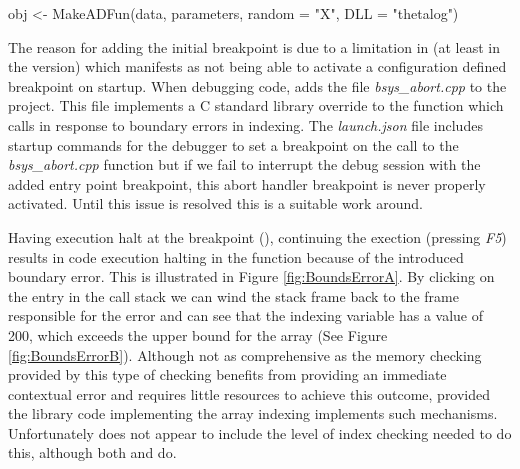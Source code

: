 \begin{Schunk}
  \begin{Sinput}
    obj <- MakeADFun(data, parameters, random = "X", DLL = "thetalog")
  \end{Sinput}
\end{Schunk}

The reason for adding the initial breakpoint is due to a limitation in (at least in the  version)  which manifests as not 
being able to activate a configuration defined breakpoint on startup. When debugging  code,  adds the file \emph{bsys\_abort.cpp}
to the project. This file implements a C standard library override to the  function which  calls in response to 
boundary errors in indexing. The \emph{launch.json} file includes startup commands for the debugger to set a breakpoint on the call to 
the \emph{bsys\_abort.cpp} function but if we fail to interrupt the debug session with the added entry point breakpoint, this 
abort handler breakpoint is never properly activated. Until this issue is resolved this is a suitable work around. 

Having execution halt at the breakpoint (), continuing the exection (pressing \emph{F5}) results in code execution halting in the 
function because of the introduced boundary error. This is illustrated in Figure \ref{fig:BoundsErrorA}. By clicking on the  entry
in the call stack we can wind the stack frame back to the frame responsible for the error and can see that the  indexing variable has a value
of 200, which exceeds the upper bound for the  array (See Figure \ref{fig:BoundsErrorB}). Although not as comprehensive as the memory checking 
provided by  this type of checking benefits from providing an immediate contextual error and requires little resources to achieve this outcome, provided 
the library code implementing the array indexing implements such mechanisms. Unfortunately  does not appear to include the level of 
index checking needed to do this, although both  and  do. 

